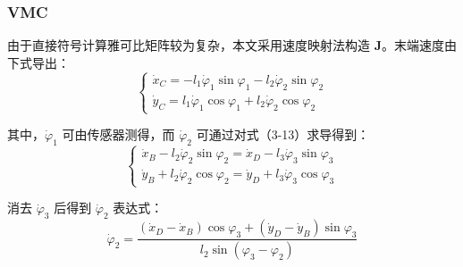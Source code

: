 \documentclass{beamer}
\begin{document}
	\begin{frame}
		\frametitle{VMC}
		由于直接符号计算雅可比矩阵较为复杂，本文采用速度映射法构造 $\mathbf{J}$。末端速度由下式导出：
		\begin{equation*}
			\begin{cases}
				\dot{x}_C = -l_1 \dot{\varphi}_1 \sin\varphi_1 - l_2 \dot{\varphi}_2 \sin\varphi_2 \\
				\dot{y}_C =  l_1 \dot{\varphi}_1 \cos\varphi_1 + l_2 \dot{\varphi}_2 \cos\varphi_2
			\end{cases}
		\end{equation*}
		
		其中，$\dot{\varphi}_1$ 可由传感器测得，而 $\dot{\varphi}_2$ 可通过对式（3-13）求导得到：
		\begin{equation*}
			\begin{cases}
				\dot{x}_B - l_2 \dot{\varphi}_2 \sin\varphi_2 = \dot{x}_D - l_3 \dot{\varphi}_3 \sin\varphi_3 \\
				\dot{y}_B + l_2 \dot{\varphi}_2 \cos\varphi_2 = \dot{y}_D + l_3 \dot{\varphi}_3 \cos\varphi_3
			\end{cases}
		\end{equation*}
		
		消去 $\dot{\varphi}_3$ 后得到 $\dot{\varphi}_2$ 表达式：
		\begin{equation*}
			\dot{\varphi}_2 = \frac{(\dot{x}_D - \dot{x}_B) \cos\varphi_3 + (\dot{y}_D - \dot{y}_B) \sin\varphi_3}{l_2 \sin(\varphi_3 - \varphi_2)}
		\end{equation*}
	\end{frame}
	
\end{document}
